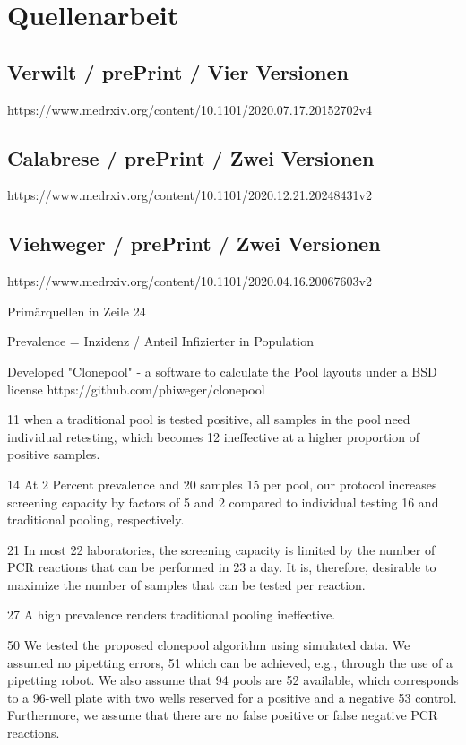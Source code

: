 \chapter{Quellenarbeit}

\section{Verwilt / prePrint / Vier Versionen}
https://www.medrxiv.org/content/10.1101/2020.07.17.20152702v4


\section{Calabrese / prePrint / Zwei Versionen}
https://www.medrxiv.org/content/10.1101/2020.12.21.20248431v2


\section{Viehweger / prePrint / Zwei Versionen}
https://www.medrxiv.org/content/10.1101/2020.04.16.20067603v2

Primärquellen in Zeile 24

Prevalence = Inzidenz / Anteil Infizierter in Population

Developed "Clonepool" - a software to calculate the Pool layouts under a BSD license https://github.com/phiweger/clonepool


11 when a traditional pool is tested positive, all samples in the pool need individual retesting, which becomes
12 ineffective at a higher proportion of positive samples.

14 At 2 Percent prevalence and 20 samples
15 per pool, our protocol increases screening capacity by factors of 5 and 2 compared to individual testing
16 and traditional pooling, respectively.

21 In most
22 laboratories, the screening capacity is limited by the number of PCR reactions that can be performed in
23 a day. It is, therefore, desirable to maximize the number of samples that can be tested per reaction.

27 A high prevalence renders traditional pooling ineffective.

50 We tested the proposed clonepool algorithm using simulated data. We assumed no pipetting errors,
51 which can be achieved, e.g., through the use of a pipetting robot. We also assume that 94 pools are
52 available, which corresponds to a 96-well plate with two wells reserved for a positive and a negative
53 control. Furthermore, we assume that there are no false positive or false negative PCR reactions.

